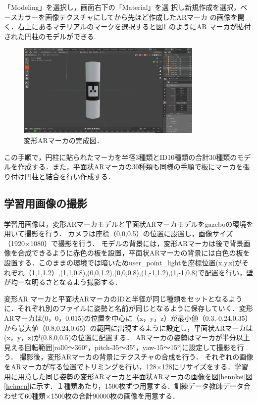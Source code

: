 「Modeling」を選択し，画面右下の「Material」を選
択し新規作成を選択，ベースカラーを画像テクスチャにしてから先ほど作成したARマーカ
の画像を開く．右上にあるマテリアルのマークを選択すると図\ref{bl4} のようにAR マーカが貼付
された円柱のモデルができる.


      \begin{figure}[htbp]
      \begin{center}
      \includegraphics[width=90mm]{figure/eps/bl4.eps}
      \caption{変形ARマーカの完成図．}
      \label{bl4}
      \end{center}
      \end{figure}



この手順で，円柱に貼られたマーカを半径3種類とID10種類の合計30種類のモデルを作成する．また，平面状ARマーカの30種類も同様の手順で板にマーカを張り付け円柱と結合を行い作成する．




\subsection{学習用画像の撮影}
学習用画像は，変形ARマーカモデルと平面状ARマーカモデルをgazebo\cite{ga}の環境を用いて撮影を行う．
カメラは座標（0,0,0.5）の位置に設置し，画像サイズ（1920$\times$1080）で撮影を行う．
モデルの背景には，変形ARマーカは後で背景画像を合成できるように赤色の板を設置，平面状ARマーカの背景には白色の板を設置する．このままの環境では暗いためuser\_point\_lightを座標位置(x,y,z)がそれぞれ（1,1,1.2）,(1,1,0.8),(0,0,1.2),(0,0,0.8),(1,-1,1.2),(1,-1,0.8)で配置を行い，壁が均一な明るさとなるよう撮影する．

変形AR マーカと平面状ARマーカのIDと半径が同じ種類をセットとなるように．それぞれ別のファイルに姿勢と名前が同じとなるように保存していく．変形ARマーカは(0，0，0.015)の位置を中心に（x，y，z）が最小値（0.3,-0.24,0.35）から最大値（0.8,0.24,0.65）の範囲に出現するように設定し，平面状ARマーカは(x，y，z)が(0.8,0,0.5)の位置に配置する．
ARマーカの姿勢はマーカが半分以上見える回転範囲[roll0～360°，pitch-35～35°，yaw-15～15°]に設定して撮影を行う．
撮影後，変形ARマーカの背景にテクスチャの合成を行う．
それぞれの画像をARマーカが写る位置でトリミングを行い，128$\times$128にリサイズをする．学習用に用意した同じ姿勢の変形ARマーカと平面状ARマーカの画像を図\ref{hennkei}図\ref{heimen}に示す．１種類あたり，1500枚ずつ用意する．訓練データ教師データ合わせて60種類$\times$1500枚の合計90000枚の画像を用意する．















